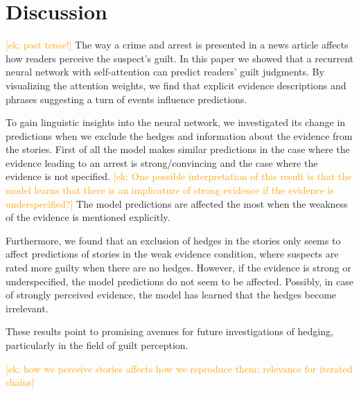 \documentclass[11pt,a4paper]{article}
\newcommand{\ek}[1]{\textcolor{Orange}{[ek: #1]}}
\begin{document}
%
%

\section{Discussion}
\ek{past tense!}
The way a crime and arrest is presented in a news article affects how readers perceive the suspect's guilt. In this paper we showed that a recurrent neural network with self-attention can predict readers' guilt judgments. 
By visualizing the attention weights, we find that explicit evidence descriptions and phrases suggesting a turn of events influence predictions. 

To gain linguistic insights into the neural network, we investigated its change in predictions when we exclude the hedges and information about the evidence from the stories. First of all the model makes similar predictions in the case where the evidence leading to an arrest is strong/convincing and the case where the evidence is not specified. 
\ek{One possible interpretation of this result is that the model learns that there is an implicature of strong evidence if the evidence is underspecified?} The model predictions are affected the most when the weakness of the evidence is mentioned explicitly.

Furthermore, we found that an exclusion of hedges in the stories only seems to affect predictions of stories in the weak evidence condition, where suspects are rated more guilty when there are no hedges. However, if the evidence is strong or underspecified, the model predictions do not seem to be affected. 
Possibly, in case of strongly perceived evidence, the model has learned that the hedges become irrelevant.

These results point to promising avenues for future investigations of hedging, particularly in the field of guilt perception. 

\ek{how we perceive stories affects how we reproduce them; relevance for iterated chains}
\end{document}
